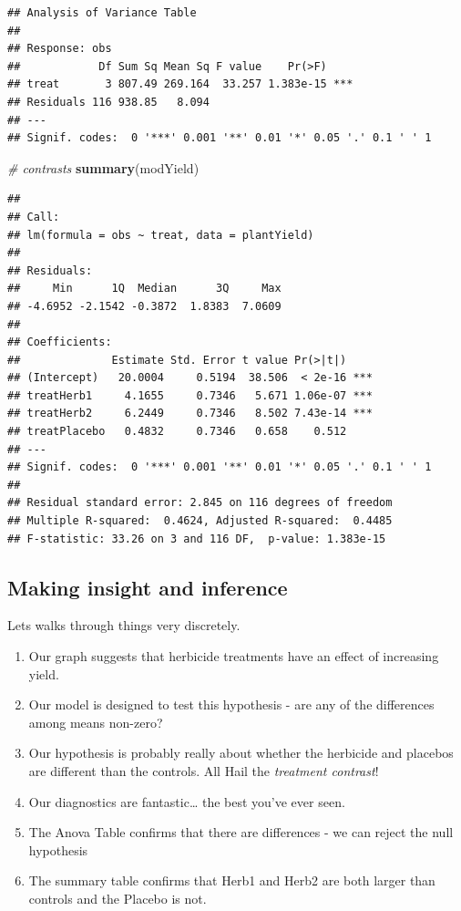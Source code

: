 \documentclass[
]{book}
\newenvironment{Shaded}{\begin{snugshade}}{\end{snugshade}}
\newcommand{\CommentTok}[1]{\textcolor[rgb]{0.56,0.35,0.01}{\textit{#1}}}
\newcommand{\FunctionTok}[1]{\textcolor[rgb]{0.13,0.29,0.53}{\textbf{#1}}}
\newcommand{\NormalTok}[1]{#1}
\providecommand{\tightlist}{%
  \setlength{\itemsep}{0pt}\setlength{\parskip}{0pt}}
\begin{document}
\begin{verbatim}
## Analysis of Variance Table
## 
## Response: obs
##            Df Sum Sq Mean Sq F value    Pr(>F)    
## treat       3 807.49 269.164  33.257 1.383e-15 ***
## Residuals 116 938.85   8.094                      
## ---
## Signif. codes:  0 '***' 0.001 '**' 0.01 '*' 0.05 '.' 0.1 ' ' 1
\end{verbatim}

\begin{Shaded}
\begin{Highlighting}[]
\CommentTok{\# contrasts}
\FunctionTok{summary}\NormalTok{(modYield)}
\end{Highlighting}
\end{Shaded}

\begin{verbatim}
## 
## Call:
## lm(formula = obs ~ treat, data = plantYield)
## 
## Residuals:
##     Min      1Q  Median      3Q     Max 
## -4.6952 -2.1542 -0.3872  1.8383  7.0609 
## 
## Coefficients:
##              Estimate Std. Error t value Pr(>|t|)    
## (Intercept)   20.0004     0.5194  38.506  < 2e-16 ***
## treatHerb1     4.1655     0.7346   5.671 1.06e-07 ***
## treatHerb2     6.2449     0.7346   8.502 7.43e-14 ***
## treatPlacebo   0.4832     0.7346   0.658    0.512    
## ---
## Signif. codes:  0 '***' 0.001 '**' 0.01 '*' 0.05 '.' 0.1 ' ' 1
## 
## Residual standard error: 2.845 on 116 degrees of freedom
## Multiple R-squared:  0.4624, Adjusted R-squared:  0.4485 
## F-statistic: 33.26 on 3 and 116 DF,  p-value: 1.383e-15
\end{verbatim}

\hypertarget{making-insight-and-inference}{%
\subsection{Making insight and inference}\label{making-insight-and-inference}}

Lets walks through things very discretely.

\begin{enumerate}
\def\labelenumi{\arabic{enumi}.}
\tightlist
\item
  Our graph suggests that herbicide treatments have an effect of increasing yield.
\item
  Our model is designed to test this hypothesis - are any of the differences among means non-zero?
\item
  Our hypothesis is probably really about whether the herbicide and placebos are different than the controls. All Hail the \emph{treatment contrast}!
\item
  Our diagnostics are fantastic\ldots{} the best you've ever seen.
\item
  The Anova Table confirms that there are differences - we can reject the null hypothesis
\item
  The summary table confirms that Herb1 and Herb2 are both larger than controls and the Placebo is not.
\end{enumerate}
\end{document}

